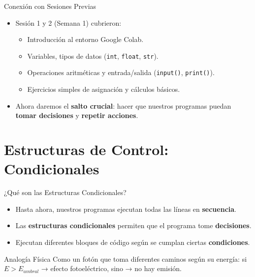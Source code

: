 \documentclass[10pt]{beamer}
\begin{document}
\begin{frame}{Conexión con Sesiones Previas}
  \begin{itemize}
    \item Sesión 1 y 2 (Semana 1) cubrieron:
      \begin{itemize}
        \item Introducción al entorno Google Colab.
        \item Variables, tipos de datos (\texttt{int}, \texttt{float}, \texttt{str}).
        \item Operaciones aritméticas y entrada/salida (\texttt{input()}, \texttt{print()}).
        \item Ejercicios simples de asignación y cálculos básicos.
      \end{itemize}
    \item Ahora daremos el \textbf{salto crucial}: hacer que nuestros programas puedan \textbf{tomar decisiones} y \textbf{repetir acciones}.
  \end{itemize}
\end{frame}

\section{Estructuras de Control: Condicionales}

\begin{frame}{¿Qué son las Estructuras Condicionales?}
  \begin{itemize}
    \item Hasta ahora, nuestros programas ejecutan todas las líneas en \textbf{secuencia}.
    \item Las \textbf{estructuras condicionales} permiten que el programa tome \textbf{decisiones}.
    \item Ejecutan diferentes bloques de código según se cumplan ciertas \textbf{condiciones}.
  \end{itemize}
  
  \begin{block}{Analogía Física}
    Como un fotón que toma diferentes caminos según su energía: si \(E > E_{umbral}\) → efecto fotoeléctrico, sino → no hay emisión.
  \end{block}
\end{frame}
\end{document}

